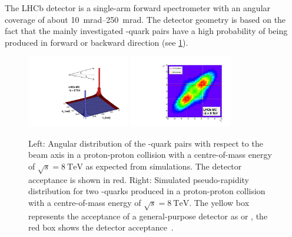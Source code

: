 The LHCb detector is a single-arm forward spectrometer with an angular coverage of about \SIrange{10}{250}{\milli\radian}.
The detector geometry is based on the fact that the mainly investigated \bbbar-quark pairs have a high probability of being produced in forward or backward direction (see \cref{fig:anglePlots}).
\begin{figure}[tbp]
    \centering
    \includegraphics[width=0.4\textwidth]{05lhcb/figs/bbbarCorrelation_angle.pdf}
    \includegraphics[width=0.4\textwidth]{05lhcb/figs/bbbarCorrelation_rapidity.pdf}
    \caption{Left: Angular distribution of the \bbbar-quark pairs with respect to the beam axis in a proton-proton collision with a centre-of-mass energy of $\sqrt{s}=\SI{8}{\tera\electronvolt}$ as expected from simulations.
    The \lhcb detector acceptance is shown in red.
    Right: Simulated pseudo-rapidity distribution for two \bquark-quarks produced in a proton-proton collision with a centre-of-mass energy of $\sqrt{s}=\SI{8}{\tera\electronvolt}$.
    The yellow box represents the acceptance of a general-purpose detector as \cms or \atlas, the red box shows the \lhcb detector acceptance~\cite{angle_plots}.}
    \label{fig:anglePlots}
\end{figure}
